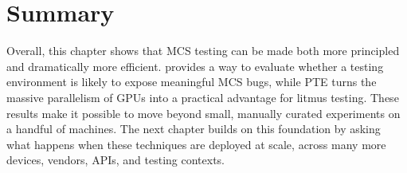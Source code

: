 \section{Summary}

Overall, this chapter shows that MCS testing can be made both more principled and dramatically more efficient. \sys provides a way to evaluate whether a testing environment is likely to expose meaningful MCS bugs, while PTE turns the massive parallelism of GPUs into a practical advantage for litmus testing. These results make it possible to move beyond small, manually curated experiments on a handful of machines. The next chapter builds on this foundation by asking what happens when these techniques are deployed at scale, across many more devices, vendors, APIs, and testing contexts.
